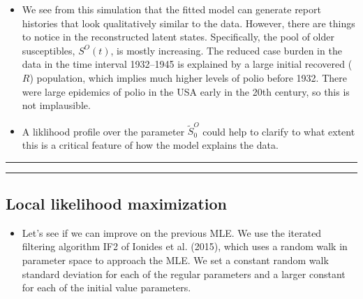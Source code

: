 \documentclass[]{article}
\providecommand{\tightlist}{%
  \setlength{\itemsep}{0pt}\setlength{\parskip}{0pt}}
\begin{document}
\begin{itemize}
\item
  We see from this simulation that the fitted model can generate report
  histories that look qualitatively similar to the data. However, there
  are things to notice in the reconstructed latent states. Specifically,
  the pool of older susceptibles, \(S^O(t)\), is mostly increasing. The
  reduced case burden in the data in the time interval 1932--1945 is
  explained by a large initial recovered (\(R\)) population, which
  implies much higher levels of polio before 1932. There were large
  epidemics of polio in the USA early in the 20th century, so this is
  not implausible.
\item
  A liklihood profile over the parameter \(\tilde S^O_0\) could help to
  clarify to what extent this is a critical feature of how the model
  explains the data.
\end{itemize}

\begin{center}\rule{0.5\linewidth}{\linethickness}\end{center}

\begin{center}\rule{0.5\linewidth}{\linethickness}\end{center}

\subsection{Local likelihood
maximization}\label{local-likelihood-maximization}

\begin{itemize}
\tightlist
\item
  Let's see if we can improve on the previous MLE. We use the iterated
  filtering algorithm IF2 of Ionides et al. (2015), which uses a random
  walk in parameter space to approach the MLE. We set a constant random
  walk standard deviation for each of the regular parameters and a
  larger constant for each of the initial value parameters.
\end{itemize}
\end{document}
